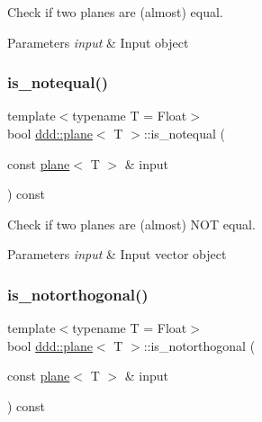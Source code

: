Check if two planes are (almost) equal. 


\begin{DoxyParams}{Parameters}
{\em input} & Input object \\
\hline
\end{DoxyParams}
\mbox{\label{classddd_1_1plane_a319553f776b468860662c166c2a9790c}} 
\subsubsection{\texorpdfstring{is\+\_\+notequal()}{is\_notequal()}}
{\footnotesize\ttfamily template$<$typename T = Float$>$ \\
bool \hyperlink{classddd_1_1plane}{ddd\+::plane}$<$ T $>$\+::is\+\_\+notequal (\begin{DoxyParamCaption}\item[{const \hyperlink{classddd_1_1plane}{plane}$<$ T $>$ \&}]{input }\end{DoxyParamCaption}) const\hspace{0.3cm}{\ttfamily [inline]}}



Check if two planes are (almost) N\+OT equal. 


\begin{DoxyParams}{Parameters}
{\em input} & Input vector object \\
\hline
\end{DoxyParams}
\mbox{\label{classddd_1_1plane_a81746ebaea1459d7b79b462c892b0937}} 
\subsubsection{\texorpdfstring{is\+\_\+notorthogonal()}{is\_notorthogonal()}}
{\footnotesize\ttfamily template$<$typename T = Float$>$ \\
bool \hyperlink{classddd_1_1plane}{ddd\+::plane}$<$ T $>$\+::is\+\_\+notorthogonal (\begin{DoxyParamCaption}\item[{const \hyperlink{classddd_1_1plane}{plane}$<$ T $>$ \&}]{input }\end{DoxyParamCaption}) const\hspace{0.3cm}{\ttfamily [inline]}}



